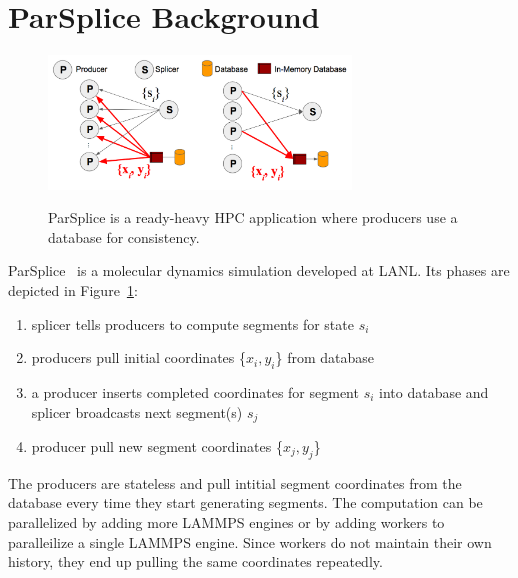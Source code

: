 \section{ParSplice Background}

\label{sec:parsplice}

\begin{figure}[t]
  \noindent\includegraphics[width=19pc,angle=0]{figures/arch-parsplice.png}\\
  \caption{ParSplice is a ready-heavy HPC application where producers use a
  database for consistency. \label{fig:arch-parsplice}}
\end{figure}


ParSplice~\cite{perez:jctc20150parsplice} is a molecular dynamics simulation
developed at LANL. Its phases are depicted in Figure~\ref{fig:arch-parsplice}:

\begin{enumerate}

  \item splicer tells producers to compute segments for state \(s_i\)

  \item producers pull initial coordinates \{\(x_i, y_i\)\} from database

  \item a producer inserts completed coordinates for segment \(s_i\) into database and
  splicer broadcasts next segment(s) \(s_j\) 

  \item producer pull new segment coordinates \{\(x_j, y_j\)\}

\end{enumerate}

The producers are stateless and pull intitial segment coordinates from the
database every time they start generating segments. The computation can be
parallelized by adding more LAMMPS engines or by adding workers to paralleilize
a single LAMMPS engine.  Since workers do not maintain their own history, they
end up pulling the same coordinates repeatedly.

